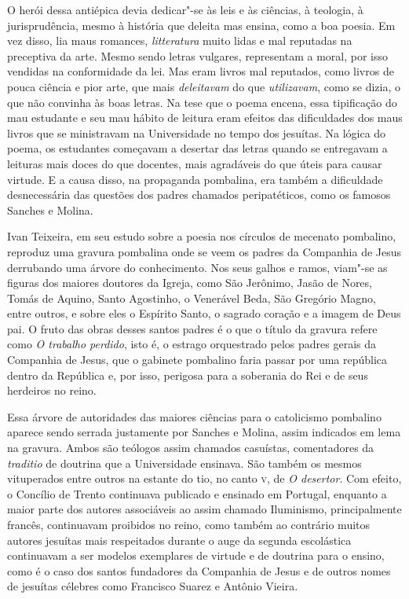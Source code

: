 O herói dessa antiépica devia dedicar"-se às leis e às ciências, à teologia, à
jurisprudência, mesmo à história que deleita mas ensina, como a boa poesia. Em
vez disso, lia maus romances, \textit{litteratura} muito lidas e mal reputadas
na preceptiva da arte. Mesmo sendo letras vulgares, representam a moral, por isso vendidas na conformidade da lei. Mas eram livros mal reputados,
como livros de pouca ciência e pior arte, que mais \textit{deleitavam} do que
\textit{utilizavam}, como se dizia, o que não convinha às boas letras. Na tese
que o poema encena, essa tipificação do mau estudante e seu mau hábito de
leitura eram efeitos das dificuldades dos maus livros que se ministravam na
Universidade no tempo dos jesuítas.  Na lógica do poema, os estudantes começavam
a desertar das letras quando se entregavam a leituras mais doces do que
docentes, mais agradáveis do que úteis para causar virtude. E a causa disso, na
propaganda pombalina, era também a dificuldade desnecessária das questões dos
padres chamados peripatéticos, como os famosos Sanches e Molina.

Ivan Teixeira, em seu estudo sobre a poesia nos círculos de mecenato pombalino,
reproduz uma gravura pombalina onde se veem os padres da Companhia de Jesus
derrubando uma árvore do conhecimento. Nos seus galhos e ramos, viam"-se as
figuras dos maiores doutores da Igreja, como São Jerônimo, Jasão de Nores, Tomás
de Aquino, Santo Agostinho, o Venerável Beda, São Gregório Magno, entre outros,
e sobre eles o Espírito Santo, o sagrado coração e a imagem de Deus pai.  O
fruto das obras desses santos padres é o que o título da gravura refere como
\textit{O trabalho perdido}, isto é, o estrago orquestrado pelos padres gerais
da Companhia de Jesus, que o gabinete pombalino faria passar por uma república
dentro da República e, por isso, perigosa para a soberania do Rei e de seus
herdeiros no reino. 

Essa árvore de autoridades das maiores ciências para o catolicismo pombalino
aparece sendo serrada justamente por Sanches e Molina, assim indicados em lema
na gravura.  Ambos são teólogos assim chamados casuístas, comentadores da
\textit{traditio} de doutrina que a Universidade ensinava. São também os mesmos
vituperados entre outros na estante do tio, no canto \textsc{v}, de \textit{O
desertor}.  Com efeito, o Concílio de Trento continuava publicado e ensinado em
Portugal, enquanto a maior parte dos autores associáveis ao assim chamado
Iluminismo, principalmente francês, continuavam proibidos no reino, como também
ao contrário muitos autores jesuítas mais respeitados durante o auge da segunda
escolástica continuavam a ser modelos exemplares de virtude e de doutrina para o
ensino, como é o caso dos santos fundadores da Companhia de Jesus e de outros
nomes de jesuítas célebres como Francisco Suarez e Antônio Vieira. 

